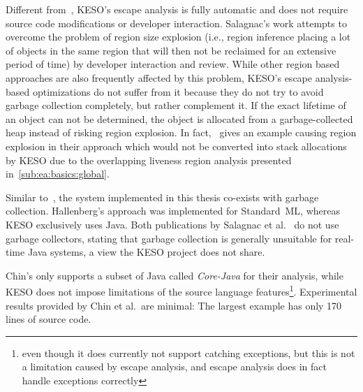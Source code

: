 	Different from~\cite{grossman:02:pldi, salagnac:07:rtcsa}, KESO's escape analysis is fully automatic and does not
	require source code modifications or developer interaction. Salagnac's work attempts to overcome the problem of region
	size explosion (i.e., region inference placing a lot of objects in the same region that will then not be reclaimed for
	an extensive period of time) by developer interaction and review. While other region based approaches are also
	frequently affected by this problem, KESO's escape analysis-based optimizations do not suffer from it because they do
	not try to avoid garbage collection completely, but rather complement it. If the exact lifetime of an object can not
	be determined, the object is allocated from a garbage-collected heap instead of risking region explosion. In
	fact,~\cite{salagnac:07:rtcsa} gives an example causing region explosion in their approach which would not be
	converted into stack allocations by KESO due to the overlapping liveness region analysis presented
	in~\cref{sub:ea:basics:global}.

	Similar to~\cite{hallenberg:02:sigplan}, the system implemented in this thesis co-exists with garbage collection.
	Hallenberg's approach was implemented for Standard~ML, whereas KESO exclusively uses Java. Both publications by
	Salagnac et al.~\cite{salagnac:05:aiool, salagnac:07:rtcsa} do not use garbage collectors, stating that garbage
	collection is generally unsuitable for real-time Java systems, a view the KESO project does not share.

	Chin's \cite{chin:04:pldi} only supports a subset of Java called \emph{Core-Java} for their analysis, while KESO does
	not impose limitations of the source language features\footnote{even though it does currently not support catching
	exceptions, but this is not a limitation caused by escape analysis, and escape analysis does in fact handle exceptions
	correctly}. Experimental results provided by Chin et al.\ are minimal: The largest example has only 170 lines of
	source code.

